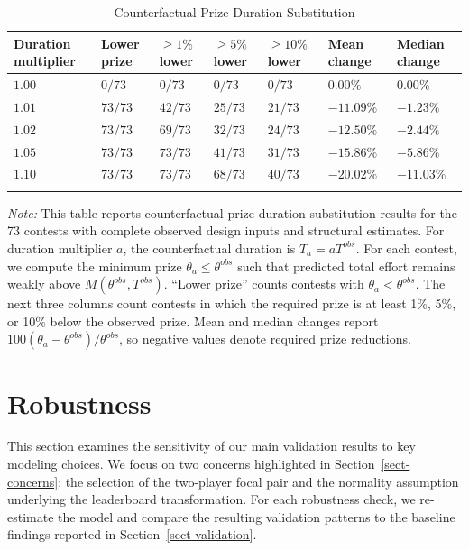 \documentclass[mnsc]{informs3}
\begin{document}
\begin{table}[htbp]
\centering
\caption{Counterfactual Prize-Duration Substitution}
\label{tab-counterfactual-policy}
\scriptsize
\begin{tabularx}{\textwidth}{lYYYYYY}
\toprule
\textbf{Duration multiplier} & \textbf{Lower prize} & \textbf{$\geq1\%$ lower} & \textbf{$\geq5\%$ lower} & \textbf{$\geq10\%$ lower} & \textbf{Mean change} & \textbf{Median change} \\
\midrule
$1.00$ & $0/73$ & $0/73$ & $0/73$ & $0/73$ & $0.00\%$ & $0.00\%$ \\
$1.01$ & $73/73$ & $42/73$ & $25/73$ & $21/73$ & $-11.09\%$ & $-1.23\%$ \\
$1.02$ & $73/73$ & $69/73$ & $32/73$ & $24/73$ & $-12.50\%$ & $-2.44\%$ \\
$1.05$ & $73/73$ & $73/73$ & $41/73$ & $31/73$ & $-15.86\%$ & $-5.86\%$ \\
$1.10$ & $73/73$ & $73/73$ & $68/73$ & $40/73$ & $-20.02\%$ & $-11.03\%$ \\
\bottomrule
\addlinespace[0.5ex]
\end{tabularx}
\begin{minipage}{\textwidth}
{\footnotesize
\textit{Note:}
This table reports counterfactual prize-duration substitution results for the 73 contests with complete observed design inputs and structural estimates.
For duration multiplier $a$, the counterfactual duration is $T_a=aT^{obs}$.
For each contest, we compute the minimum prize $\theta_a\leq\theta^{obs}$ such that predicted total effort remains weakly above $M(\theta^{obs},T^{obs})$.
``Lower prize'' counts contests with $\theta_a<\theta^{obs}$.
The next three columns count contests in which the required prize is at least 1\%, 5\%, or 10\% below the observed prize.
Mean and median changes report $100(\theta_a-\theta^{obs})/\theta^{obs}$, so negative values denote required prize reductions.
}
\end{minipage}
\end{table}





\section{Robustness}

This section examines the sensitivity of our main validation results to key modeling choices.
We focus on two concerns highlighted in Section~\ref{sect-concerns}: the selection of the two-player focal pair and the normality assumption underlying the leaderboard transformation. For each robustness check, we re-estimate the model and compare the resulting validation patterns to the baseline findings reported in Section~\ref{sect-validation}.
\end{document}
